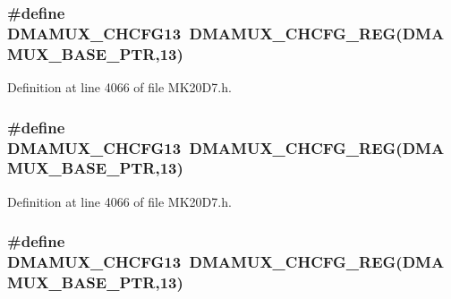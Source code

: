 \subsubsection[{\texorpdfstring{D\+M\+A\+M\+U\+X\+\_\+\+C\+H\+C\+F\+G13}{DMAMUX_CHCFG13}}]{\setlength{\rightskip}{0pt plus 5cm}\#define D\+M\+A\+M\+U\+X\+\_\+\+C\+H\+C\+F\+G13~{\bf D\+M\+A\+M\+U\+X\+\_\+\+C\+H\+C\+F\+G\+\_\+\+R\+EG}({\bf D\+M\+A\+M\+U\+X\+\_\+\+B\+A\+S\+E\+\_\+\+P\+TR},13)}\hypertarget{group___d_m_a_m_u_x___register___accessor___macros_gaf5faf449e854cb5b9a64613f784ff082}{}\label{group___d_m_a_m_u_x___register___accessor___macros_gaf5faf449e854cb5b9a64613f784ff082}


Definition at line 4066 of file M\+K20\+D7.\+h.

\subsubsection[{\texorpdfstring{D\+M\+A\+M\+U\+X\+\_\+\+C\+H\+C\+F\+G13}{DMAMUX_CHCFG13}}]{\setlength{\rightskip}{0pt plus 5cm}\#define D\+M\+A\+M\+U\+X\+\_\+\+C\+H\+C\+F\+G13~{\bf D\+M\+A\+M\+U\+X\+\_\+\+C\+H\+C\+F\+G\+\_\+\+R\+EG}({\bf D\+M\+A\+M\+U\+X\+\_\+\+B\+A\+S\+E\+\_\+\+P\+TR},13)}\hypertarget{group___d_m_a_m_u_x___register___accessor___macros_gaf5faf449e854cb5b9a64613f784ff082}{}\label{group___d_m_a_m_u_x___register___accessor___macros_gaf5faf449e854cb5b9a64613f784ff082}


Definition at line 4066 of file M\+K20\+D7.\+h.

\subsubsection[{\texorpdfstring{D\+M\+A\+M\+U\+X\+\_\+\+C\+H\+C\+F\+G13}{DMAMUX_CHCFG13}}]{\setlength{\rightskip}{0pt plus 5cm}\#define D\+M\+A\+M\+U\+X\+\_\+\+C\+H\+C\+F\+G13~{\bf D\+M\+A\+M\+U\+X\+\_\+\+C\+H\+C\+F\+G\+\_\+\+R\+EG}({\bf D\+M\+A\+M\+U\+X\+\_\+\+B\+A\+S\+E\+\_\+\+P\+TR},13)}\hypertarget{group___d_m_a_m_u_x___register___accessor___macros_gaf5faf449e854cb5b9a64613f784ff082}{}\label{group___d_m_a_m_u_x___register___accessor___macros_gaf5faf449e854cb5b9a64613f784ff082}


